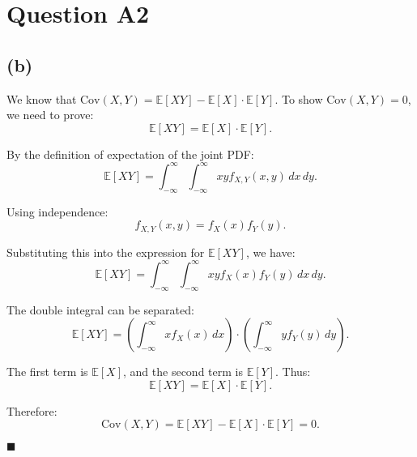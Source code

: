 \documentclass{article}
\begin{document}
\section*{Question A2}
\subsection*{(b)}

We know that $\text{Cov}(X, Y) = \mathbb{E}[XY] - \mathbb{E}[X] \cdot \mathbb{E}[Y]$. To show $\text{Cov}(X, Y) = 0$, we need to prove:
\[
\mathbb{E}[XY] = \mathbb{E}[X] \cdot \mathbb{E}[Y].
\]

By the definition of expectation of the joint PDF:
\[
\mathbb{E}[XY] = \int_{-\infty}^\infty \int_{-\infty}^\infty xy f_{X,Y}(x, y) \, dx \, dy.
\]

Using independence:
\[
f_{X,Y}(x, y) = f_X(x) f_Y(y).
\]

Substituting this into the expression for $\mathbb{E}[XY]$, we have:
\[
\mathbb{E}[XY] = \int_{-\infty}^\infty \int_{-\infty}^\infty xy f_X(x) f_Y(y) \, dx \, dy.
\]

The double integral can be separated:
\[
\mathbb{E}[XY] = \left( \int_{-\infty}^\infty x f_X(x) \, dx \right) \cdot \left( \int_{-\infty}^\infty y f_Y(y) \, dy \right).
\]

The first term is $\mathbb{E}[X]$, and the second term is $\mathbb{E}[Y]$. Thus:
\[
\mathbb{E}[XY] = \mathbb{E}[X] \cdot \mathbb{E}[Y].
\]

Therefore:
\[
\text{Cov}(X, Y) = \mathbb{E}[XY] - \mathbb{E}[X] \cdot \mathbb{E}[Y] = 0.
\]

\hfill\(\blacksquare\)
\end{document}
